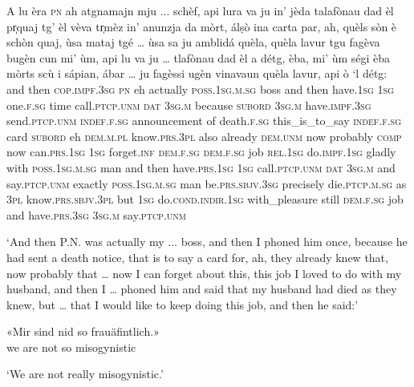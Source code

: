 \begin{linenumbers}
\gll  A lu èra \textsc{pn} ah atgnamajn mju ... schèf, api lura va ju in’ jèda talafònau dad èl pr̩quaj tg' èl vèva tr̩mèz in’ anunzja da mòrt, álṣò ina carta par, ah, quèls sòn è schòn quaj, ùsa mataj tgé … ùsa sa ju amblidá quèla, quèla lavur tgu fagèva bugèn\footnotemark{} cun mi' ùm, api lu va ju … tlafònau dad èl a détg, èba, mi' ùm ségi èba mòrts scù i sápian, ábar … ju fagèssi ugèn vinavaun quèla lavur, api ò `l détg:  \\
and then \textsc{cop.impf.3sg} \textsc{pn} eh actually \textsc{poss.1sg.m.sg} {} boss and then have.\textsc{1sg}  \textsc{1sg} one.\textsc{f.sg} time call.\textsc{ptcp.unm} \textsc{dat} \textsc{3sg.m} because \textsc{subord} \textsc{3sg.m} have.\textsc{impf.3sg} send.\textsc{ptcp.unm} \textsc{indef.f.sg} announcement of death.\textsc{f.sg} this\_is\_to\_say \textsc{indef.f.sg} card \textsc{subord} eh \textsc{dem.m.pl} know.\textsc{prs.3pl} also already \textsc{dem.unm} now probably \textsc{comp} {} now can.\textsc{prs.1sg} \textsc{1sg} forget.\textsc{inf} \textsc{dem.f.sg} \textsc{dem.f.sg} job \textsc{rel.1sg} do.\textsc{impf.1sg} gladly with \textsc{poss.1sg.m.sg} man and then have.\textsc{prs.1sg} \textsc{1sg} {} call.\textsc{ptcp.unm} \textsc{dat} \textsc{3sg.m} and say.\textsc{ptcp.unm} exactly \textsc{poss.1sg.m.sg} man be.\textsc{prs.sbjv.3sg} precisely die.\textsc{ptcp.m.sg} as \textsc{3pl} know.\textsc{prs.sbjv.3pl} but \textsc{1sg} {} do.\textsc{cond.indir.1sg} with\_pleasure still \textsc{dem.f.sg} job and have.\textsc{prs.3sg} \textsc{3sg.m} say.\textsc{ptcp.unm}\\ 
\end{linenumbers}
\medskip
\glt `And then P.N. was actually my ... boss, and then I phoned him once, because he had sent a death notice, that is to say a card for, ah, they already knew that, now probably that … now I can forget about this, this job I loved to do with my husband, and then I … phoned him and said that my husband had died as they knew, but … that I would like to keep doing this job, and then he said:'
\medskip

\begin{linenumbers}
\gll  «Mir sind nid so frauäfintlich.»\footnotemark   \\
we are not so misogynistic  \\
\end{linenumbers}
\medskip
\glt `We are not really misogynistic.'
\medskip

